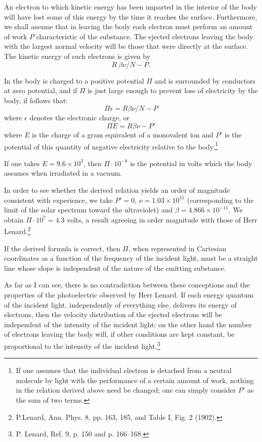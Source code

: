 \documentclass[12pt]{article}
\begin{document}
An electron to which kinetic energy has been imparted in the interior of the
body will have lost some of this energy by the time it reaches the surface.
Furthermore, we shall assume that in leaving the body each electron must perform
an amount of work $P$ characteristic of the substance. The ejected electrons
leaving the body with the largest normal velocity will be those that were
directly at the surface. The kinetic energy of such electrons is given by 
$$
R~ \beta \nu/N - P.
$$

In the body is charged to a positive potential  $\Pi$ and is surrounded by
conductors at zero potential, and if $\Pi$ is just large 
enough to prevent
loss of electricity by the body, if follows that: 
$$
\Pi \epsilon = R \beta \nu/N - P
$$
where $\epsilon$ denotes the electronic charge, or 
$$
\Pi E = R \beta \nu - P'
$$
where $E$ is the charge of a gram equivalent of a monovalent ion and $P'$ is the
potential of this quantity of negative electricity relative to the 
body.\footnote{If one assumes that the individual electron is detached from a
neutral molecule by light with the performance of a certain amount of work,
nothing in the relation derived above need be changed; one can simply consider $
P'$ as the sum of two terms.}

If one takes $E = 9.6 \times 10^3$, then $\Pi \cdot 10^{-8}$ is 
the potential
in volts which the body assumes when irradiated in a vacuum.

In order to see whether the derived relation yields an 
order of magnitude
consistent with experience, we take 
$P' = 0$, $\nu = 1.03 \times 10^{15}$
(corresponding to the limit of the 
solar spectrum toward the ultraviolet) and 
$\beta = 4.866 \times 10^{-11}$. 
We obtain $\Pi \cdot 10^7 = 4.3$ volts, a
result agreeing in order magnitude with those 
of Herr Lenard.\footnote{P.Lenard, Ann. Phys. 8, 
pp. 163, 185, and Table I, Fig. 2 (1902).}

If the derived formula is correct, then $\Pi$, when represented in Cartesian
coordinates as a function of the frequency of the incident light, must be a
straight line whose slope is independent of the nature of the emitting
substance.

As far as I can see, there is no contradiction between these conceptions and the
properties of the photoelectric observed by Herr Lenard. If each energy quantum
of the incident light, independently of everything else, delivers its energy of
electrons, then the velocity distribution of the ejected electrons will be
independent of the intensity of the incident light; on the other hand the number
of electrons leaving the body will, if other conditions are kept constant, be
proportional to the intensity of the incident light.\footnote{P. Lenard, Ref. 9,
p. 150 and p. 166--168.}
\end{document}
